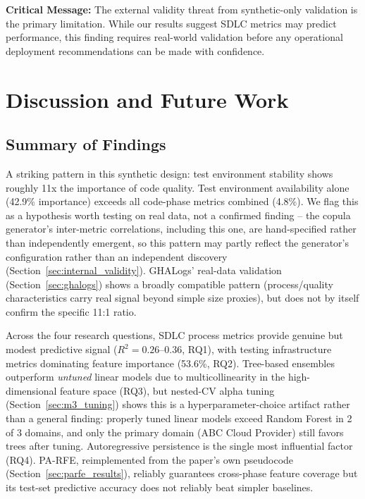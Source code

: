 \documentclass[technologies,article,submit,pdftex,moreauthors]{Definitions/mdpi}
\begin{document}
\textbf{Critical Message:} The external validity threat from
synthetic-only validation is the primary limitation. While our results
suggest SDLC metrics may predict performance, this finding requires
real-world validation before any operational deployment recommendations
can be made with confidence.

\section{Discussion and Future Work}\label{sec:discussion}

\subsection{Summary of Findings}\label{sec:summary_findings}

A striking pattern in this synthetic design: test environment stability
shows roughly 11x the importance of code quality. Test environment
availability alone (42.9\% importance) exceeds all code-phase metrics
combined (4.8\%). We flag this as a hypothesis worth testing on real
data, not a confirmed finding -- the copula generator's inter-metric
correlations, including this one, are hand-specified rather than
independently emergent, so this pattern may partly reflect the
generator's configuration rather than an independent discovery (Section~\ref{sec:internal_validity}). GHALogs' real-data validation (Section~\ref{sec:ghalogs}) shows a broadly
compatible pattern (process/quality characteristics carry real signal
beyond simple size proxies), but does not by itself confirm the specific
11:1 ratio.

Across the four research questions, SDLC process metrics provide genuine
but modest predictive signal (\(R^2 = 0.26\)--\(0.36\), RQ1), with
testing infrastructure metrics dominating feature importance (53.6\%,
RQ2). Tree-based ensembles outperform \emph{untuned} linear models due
to multicollinearity in the high-dimensional feature space (RQ3), but
nested-CV alpha tuning (Section~\ref{sec:m3_tuning}) shows this is a
hyperparameter-choice artifact rather than a general finding: properly
tuned linear models exceed Random Forest in 2 of 3 domains, and only the
primary domain (ABC Cloud Provider) still favors trees after tuning.
Autoregressive persistence is the single most influential factor (RQ4).
PA-RFE, reimplemented from the paper's own pseudocode (Section~\ref{sec:parfe_results}),
reliably guarantees cross-phase feature coverage but its test-set
predictive accuracy does not reliably beat simpler baselines.
\end{document}
